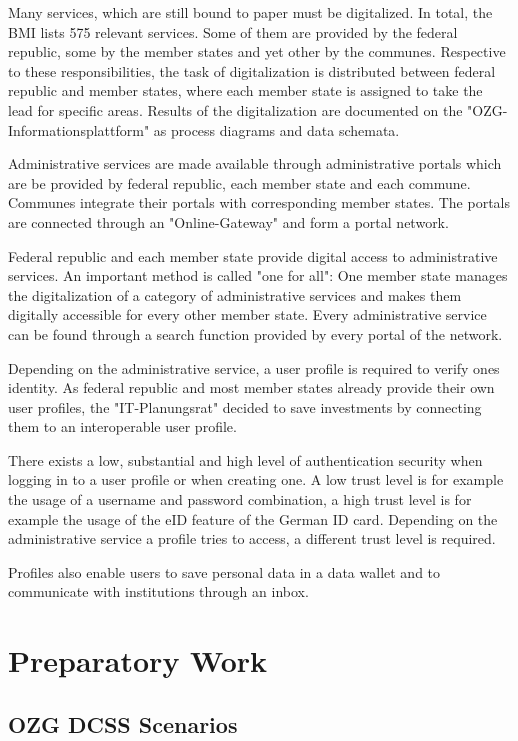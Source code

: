 \documentclass[
     12pt,         %
     a4paper,      %
     BCOR=10mm,version=first,     %
     DIV=14,version=first,        %
     ]{scrreprt}
\begin{document}
Many services, which are still bound to paper must be digitalized. In total, the BMI lists 575 relevant services. Some of them are provided by the federal republic, some by the member states and yet other by the communes. Respective to these responsibilities, the task of digitalization is distributed between federal republic and member states, where each member state is assigned to take the lead for specific areas. \cite{BMI:Onlinezugangsgesetz} Results of the digitalization are documented on the "OZG-Informationsplattform" \cite{BMI:Informatiosplattform} as process diagrams and data schemata.

Administrative services are made available through administrative portals which are be provided by federal republic, each member state and each commune. Communes integrate their portals with corresponding member states. The portals are connected through an "Online-Gateway" and form a portal network.

Federal republic and each member state provide digital access to administrative services. An important method is called "one for all": One member state manages the digitalization of a category of administrative services and makes them digitally accessible for every other member state. Every administrative service can be found through a search function provided by every portal of the network.

Depending on the administrative service, a user profile is required to verify ones identity. As federal republic and most member states already provide their own user profiles, the "IT-Planungsrat" decided to save investments by connecting them to an interoperable user profile.

There exists a low, substantial and high level of authentication security when logging in to a user profile or when creating one.
A low trust level is for example the usage of a username and password combination, a high trust level is for example the usage of the eID feature of the German ID card. Depending on the administrative service a profile tries to access, a different trust level is required.

Profiles also enable users to save personal data in a data wallet and to communicate with institutions through an inbox.

\chapter{Preparatory Work}

\section{OZG DCSS Scenarios}
\end{document}
